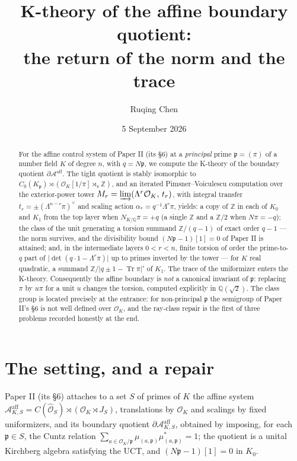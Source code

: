 \documentclass[11pt]{amsart}
\title[K-theory of the affine boundary quotient]{K-theory of the affine boundary quotient:\\ the return of the norm and the trace}
\author{Ruqing Chen}
\date{5 September 2026}
\theoremstyle{remark}
\newcommand{\OK}{\mathcal{O}_K}
\newcommand{\pp}{\mathfrak{p}}
\newcommand{\Z}{\mathbb{Z}}
\newcommand{\Q}{\mathbb{Q}}
\newcommand{\Ns}{N}
\newcommand{\Tr}{\operatorname{Tr}}
\newcommand{\Aaff}{\mathcal{A}^{\mathrm{aff}}}
\begin{document}
\begin{abstract}
For the affine control system of Paper II (its \S6) at a \emph{principal} prime
$\pp=(\pi)$ of a number field $K$ of degree $n$, with $q=\Ns\pp$, we compute the K-theory
of the boundary quotient $\partial\Aaff$. The tight quotient is stably isomorphic to
$C_0(K_\pp)\rtimes(\OK[1/\pi]\rtimes_\pi\Z)$, and an iterated Pimsner--Voiculescu
computation over the exterior-power tower $M_r=\varinjlim(\Lambda^r\OK,\,t_r)$, with
integral transfer $t_r=\pm(\Lambda^{n-r}\pi)^\vee$ and scaling action
$\alpha_*=q^{-1}\Lambda^r\pi$, yields: a copy of $\Z$ in each of $K_0$ and $K_1$ from the
top layer when $\Ns_{K/\Q}\pi=+q$ (a single $\Z$ and a $\Z/2$ when $\Ns\pi=-q$); the class
of the unit generating a torsion summand $\Z/(q-1)$ of exact order $q-1$ --- the norm
survives, and the divisibility bound $(\Ns\pp-1)[1]=0$ of Paper II is attained; and, in the
intermediate layers $0<r<n$, finite torsion of order the prime-to-$q$ part of
$\bigl|\det(q\cdot1-\Lambda^r\pi)\bigr|$ up to primes inverted by the tower --- for $K$
real quadratic, a summand $\Z/|q\pm1-\Tr\pi|'$ of $K_1$. The trace of the uniformizer
enters the K-theory. Consequently the affine boundary is \emph{not} a canonical invariant
of $\pp$: replacing $\pi$ by $u\pi$ for a unit $u$ changes the torsion, computed explicitly
in $\Q(\sqrt2)$. The class group is located precisely at the entrance: for non-principal
$\pp$ the semigroup of Paper II's \S6 is not well defined over $\OK$, and the ray-class
repair is the first of three problems recorded honestly at the end.
\end{abstract}

\maketitle

\section{The setting, and a repair}\label{sec:setting}

Paper II (its \S6) attaches to a set $S$ of primes of $K$ the affine system
$\Aaff_{K,S}=C(\widehat{\mathcal O}_S)\rtimes(\OK\rtimes J_S)$, translations by $\OK$ and
scalings by fixed uniformizers, and its boundary quotient $\partial\Aaff_{K,S}$, obtained
by imposing, for each $\pp\in S$, the Cuntz relation
$\sum_{a\in\OK/\pp}\mu_{(a,\pp)}\mu_{(a,\pp)}^*=1$; the quotient is a unital Kirchberg
algebra satisfying the UCT, and $(\Ns\pp-1)[1]=0$ in $K_0$.
\end{document}
